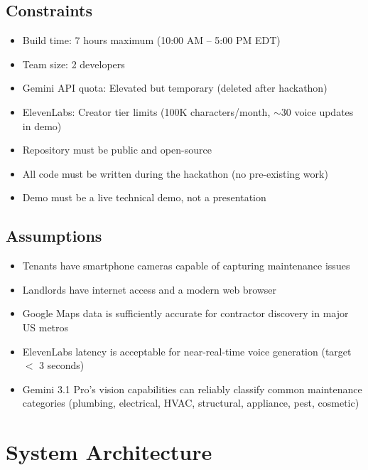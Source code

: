 \documentclass[12pt,a4paper]{article}
\begin{document}
\subsection{Constraints}

\begin{itemize}
    \item Build time: 7 hours maximum (10:00 AM -- 5:00 PM EDT)
    \item Team size: 2 developers
    \item Gemini API quota: Elevated but temporary (deleted after hackathon)
    \item ElevenLabs: Creator tier limits (100K characters/month, $\sim$30 voice updates in demo)
    \item Repository must be public and open-source
    \item All code must be written during the hackathon (no pre-existing work)
    \item Demo must be a live technical demo, not a presentation
\end{itemize}

\subsection{Assumptions}

\begin{itemize}
    \item Tenants have smartphone cameras capable of capturing maintenance issues
    \item Landlords have internet access and a modern web browser
    \item Google Maps data is sufficiently accurate for contractor discovery in major US metros
    \item ElevenLabs latency is acceptable for near-real-time voice generation (target $<$ 3 seconds)
    \item Gemini 3.1 Pro's vision capabilities can reliably classify common maintenance categories (plumbing, electrical, HVAC, structural, appliance, pest, cosmetic)
\end{itemize}

\section{System Architecture}
\end{document}
